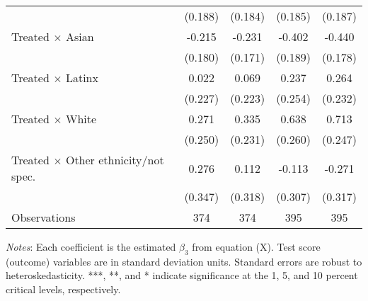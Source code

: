 \begin{table}[htbp]
\begin{threeparttable}
\begin{tabular}{l*{4}{c}}
                    &     (0.188)         &     (0.184)         &     (0.185)         &     (0.187)         \\
[1em]
Treated $\times$ Asian&      -0.215         &      -0.231         &      -0.402\sym{*}  &      -0.440\sym{*}  \\
                    &     (0.180)         &     (0.171)         &     (0.189)         &     (0.178)         \\
[1em]
Treated $\times$ Latinx&       0.022         &       0.069         &       0.237         &       0.264         \\
                    &     (0.227)         &     (0.223)         &     (0.254)         &     (0.232)         \\
[1em]
Treated $\times$ White&       0.271         &       0.335         &       0.638\sym{*}  &       0.713\sym{**} \\
                    &     (0.250)         &     (0.231)         &     (0.260)         &     (0.247)         \\
[1em]
Treated $\times$ Other ethnicity/not spec.&       0.276         &       0.112         &      -0.113         &      -0.271         \\
                    &     (0.347)         &     (0.318)         &     (0.307)         &     (0.317)         \\
\midrule
Observations        &         374         &         374         &         395         &         395         \\
\bottomrule \end{tabular} \begin{tablenotes} \item \textit{Notes}: Each coefficient is the estimated $\beta_3$ from equation (X). Test score (outcome) variables are in standard deviation units. Standard errors are robust to heteroskedasticity. ***, **, and * indicate significance at the 1, 5, and 10 percent critical levels, respectively. \end{tablenotes} \end{threeparttable} \end{table}
